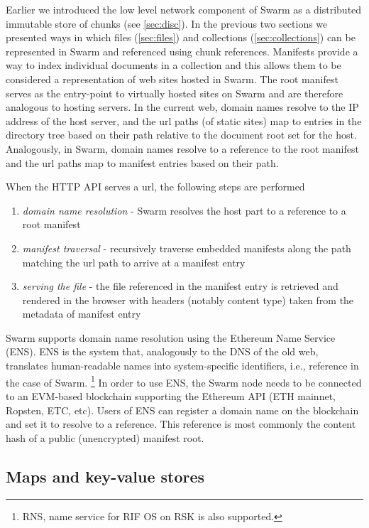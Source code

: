Earlier we introduced the low level network component of Swarm as a distributed immutable store of chunks (see \ref{sec:disc}). In the previous two sections we presented ways in which files (\ref{sec:files}) and collections (\ref{sec:collections}) can be represented in Swarm and referenced using chunk references. Manifests provide a way to index individual documents in a collection and this allows them to be considered a representation of web sites hosted in Swarm. The root manifest serves as the entry-point to virtually hosted sites on Swarm and are therefore analogous to hosting servers. In the current web, domain names resolve to the IP address of the host server, and the url paths (of static sites) map to entries in the directory tree based on their path relative to the document root set for the host.
Analogously, in Swarm, domain names resolve to a reference to the root manifest and the url paths map to manifest entries based on their path.  

When the HTTP API serves a url, the following steps are performed

\begin{enumerate}
    \item \emph{domain name resolution} - Swarm resolves the host part to a reference to a root manifest
    \item \emph{manifest traversal} - recursively traverse embedded manifests along the path matching the url path to arrive at a manifest entry
    \item \emph{serving the file} - the file referenced in the manifest entry is retrieved and rendered in the browser with headers (notably content type) taken from  the metadata of manifest entry
\end{enumerate}

Swarm supports domain name resolution using the Ethereum Name Service (ENS). ENS is the system that, analogously to the DNS of the old web, translates human-readable names into system-specific identifiers, i.e., reference in the case of Swarm.%
\footnote{RNS, name service for RIF OS on RSK is also supported.}
%
In order to use ENS, the Swarm node needs to be connected to an EVM-based blockchain supporting the Ethereum API (ETH mainnet, Ropsten, ETC, etc). 
Users of ENS can register a domain name on the blockchain  and set it to resolve to a reference. This reference is most commonly the content hash of a public (unencrypted) manifest root. 


\subsection{Maps and key-value stores}\label{sec:maps}

